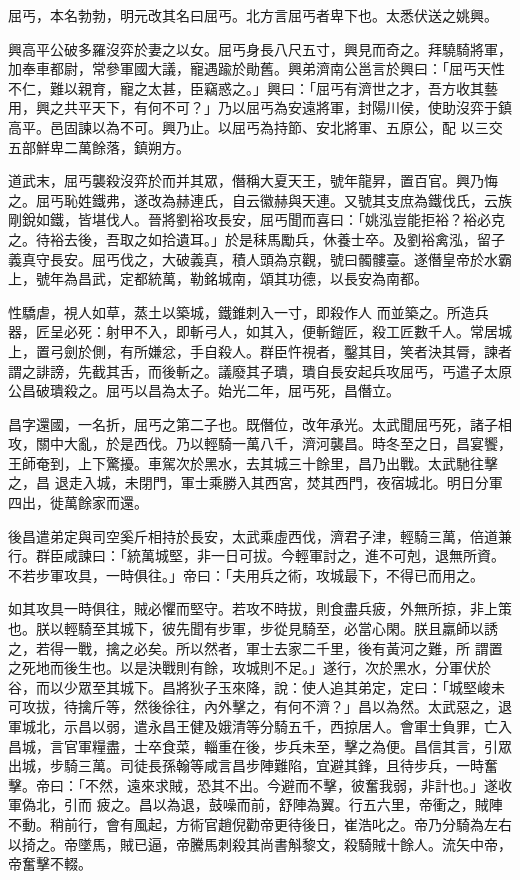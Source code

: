 \begin{pinyinscope}
 屈丐，本名勃勃，明元改其名曰屈丐。北方言屈丐者卑下也。太悉伏送之姚興。



 興高平公破多羅沒弈於妻之以女。屈丐身長八尺五寸，興見而奇之。拜驍騎將軍，加奉車都尉，常參軍國大議，寵遇踰於勛舊。興弟濟南公邕言於興曰：「屈丐天性不仁，難以親育，寵之太甚，臣竊惑之。」興曰：「屈丐有濟世之才，吾方收其藝用，興之共平天下，有何不可？」乃以屈丐為安遠將軍，封陽川侯，使助沒弈于鎮高平。邑固諫以為不可。興乃止。以屈丐為持節、安北將軍、五原公，配
 以三交五部鮮卑二萬餘落，鎮朔方。



 道武末，屈丐襲殺沒弈於而并其眾，僭稱大夏天王，號年龍昇，置百官。興乃悔之。屈丐恥姓鐵弗，遂改為赫連氏，自云徽赫與天連。又號其支庶為鐵伐氏，云族剛銳如鐵，皆堪伐人。晉將劉裕攻長安，屈丐聞而喜曰：「姚泓豈能拒裕？裕必克之。待裕去後，吾取之如拾遺耳。」於是秣馬勵兵，休養士卒。及劉裕禽泓，留子義真守長安。屈丐伐之，大破義真，積人頭為京觀，號曰髑髏臺。遂僭皇帝於水霸上，號年為昌武，定都統萬，勒銘城南，頌其功德，以長安為南都。



 性驕虐，視人如草，蒸土以築城，鐵錐刺入一寸，即殺作人
 而並築之。所造兵器，匠呈必死：射甲不入，即斬弓人，如其入，便斬鎧匠，殺工匠數千人。常居城上，置弓劍於側，有所嫌忿，手自殺人。群臣忤視者，鑿其目，笑者決其脣，諫者謂之誹謗，先截其舌，而後斬之。議廢其子璝，璝自長安起兵攻屈丐，丐遣子太原公昌破璝殺之。屈丐以昌為太子。始光二年，屈丐死，昌僭立。



 昌字還國，一名折，屈丐之第二子也。既僭位，改年承光。太武聞屈丐死，諸子相攻，關中大亂，於是西伐。乃以輕騎一萬八千，濟河襲昌。時冬至之日，昌宴饗，王師奄到，上下驚擾。車駕次於黑水，去其城三十餘里，昌乃出戰。太武馳往擊之，昌
 退走入城，未閉門，軍士乘勝入其西宮，焚其西門，夜宿城北。明日分軍四出，徙萬餘家而還。



 後昌遣弟定與司空奚斤相持於長安，太武乘虛西伐，濟君子津，輕騎三萬，倍道兼行。群臣咸諫曰：「統萬城堅，非一日可拔。今輕軍討之，進不可剋，退無所資。不若步軍攻具，一時俱往。」帝曰：「夫用兵之術，攻城最下，不得已而用之。



 如其攻具一時俱往，賊必懼而堅守。若攻不時拔，則食盡兵疲，外無所掠，非上策也。朕以輕騎至其城下，彼先聞有步軍，步從見騎至，必當心閑。朕且羸師以誘之，若得一戰，擒之必矣。所以然者，軍士去家二千里，後有黃河之難，所
 謂置之死地而後生也。以是決戰則有餘，攻城則不足。」遂行，次於黑水，分軍伏於谷，而以少眾至其城下。昌將狄子玉來降，說：使人追其弟定，定曰：「城堅峻未可攻拔，待擒斤等，然後徐往，內外擊之，有何不濟？」昌以為然。太武惡之，退軍城北，示昌以弱，遣永昌王健及娥清等分騎五千，西掠居人。會軍士負罪，亡入昌城，言官軍糧盡，士卒食菜，輜重在後，步兵未至，擊之為便。昌信其言，引眾出城，步騎三萬。司徒長孫翰等咸言昌步陣難陷，宜避其鋒，且待步兵，一時奮擊。帝曰：「不然，遠來求賊，恐其不出。今避而不擊，彼奮我弱，非計也。」遂收軍偽北，引而
 疲之。昌以為退，鼓噪而前，舒陣為翼。行五六里，帝衝之，賊陣不動。稍前行，會有風起，方術官趙倪勸帝更待後日，崔浩叱之。帝乃分騎為左右以掎之。帝墜馬，賊已逼，帝騰馬刺殺其尚書斛黎文，殺騎賊十餘人。流矢中帝，帝奮擊不輟。




\end{pinyinscope}
